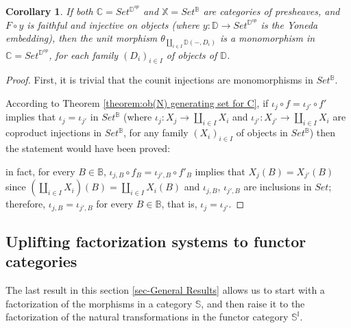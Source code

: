\documentclass[12pt,a4paper]{amsart}
\newtheorem{corollary}{Corollary}[section]
\theoremstyle{definition}
\begin{document}
\begin{corollary}\label{corollary:ob(N) generating set for C and edm}\cite[See footnote in Remark 6.1]{X:concordant&monotone} If both $\mathbb{C}=Set^{\mathbb{D}^{op}}$ and $\mathbb{X}=Set^\mathbb{B}$ are categories of presheaves, and $F\circ y$ is faithful and injective on objects (where $y:\mathbb{D}\rightarrow Set^{\mathbb{D}^{op}}$ is the Yoneda embedding), then the unit morphism $\theta_{\coprod_{i\in I}\mathbb{D}(-,D_i)}$ is a monomorphism in $\mathbb{C}=Set^{\mathbb{D}^{op}}$, for each family $(D_i)_{i\in I}$ of objects of $\mathbb{D}$.
\end{corollary}
\begin{proof}
First, it is trivial that the counit injections are monomorphisms in $Set^\mathbb{B}$.\vspace{3pt}

According to Theorem \ref{theorem:ob(N) generating set for C}, if $\iota_j\circ f=\iota_{j'}\circ f'$ implies that $\iota_j=\iota_{j'}$ in $Set^\mathbb{B}$ (where $\iota_j:X_j\rightarrow\coprod_{i\in I}X_i$ and $\iota_{j'}:X_{j'}\rightarrow\coprod_{i\in I}X_i$ are coproduct injections in $Set^\mathbb{B}$, for any family $(X_i)_{i\in I}$ of objects in $Set^\mathbb{B}$) then the statement would have been proved:

 in fact, for every $B\in \mathbb{B}$, $\iota_{j,B}\circ f_B=\iota_{j',B}\circ f'_B$ implies that $X_j(B)=X_{j'}(B)$ since $(\coprod_{i\in I}X_i)(B)=\coprod_{i\in I}X_i(B)$ and $\iota_{j,B}$, $\iota_{j',B}$ are inclusions in $Set$; therefore, $\iota_{j,B}=\iota_{j',B}$ for every $B\in\mathbb{B}$, that is, $\iota_j=\iota_{j'}$.
\end{proof}

\subsection{Uplifting factorization systems to functor categories}\label{subsec:Uplifting factorization systems to functor categories}

The last result in this section \ref{sec-General Results} allows us to start with a factorization of the morphisms in a category $\mathbb{S}$, and then raise it to the factorization of the natural transformations in the functor category $\mathbb{S}^\mathbb{I}$.
\end{document}
